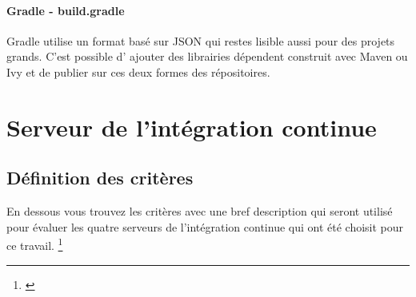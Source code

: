 	\paragraph{Gradle - build.gradle}
		Gradle utilise un format basé sur JSON qui restes lisible aussi pour des projets grands. C'est possible d' ajouter des librairies dépendent construit avec Maven ou Ivy et de publier sur ces deux formes des répositoires.

\newpage
\section{Serveur de l'intégration continue}

\subsection{Définition des critères}

En dessous vous trouvez les critères avec une bref description qui seront utilisé pour évaluer les quatre serveurs de l'intégration continue qui ont été choisit pour ce travail. \footnote{\cite{ibmciserver}}

